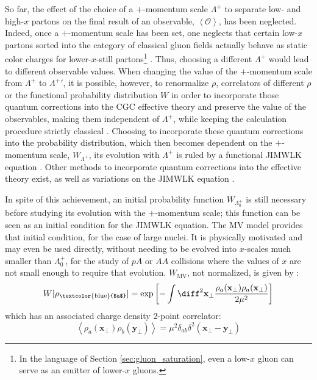 So far, the effect of the choice of a $+$-momentum scale $\Lambda^+$ to separate low- and high-$x$ partons on the final result of an observable, $\left< \mathcal{O} \right>$, has been neglected. Indeed, once a $+$-momentum scale has been set, one neglects that certain low-$x$ partons sorted into the category of classical gluon fields actually behave as static color charges for lower-$x$-still partons\footnote{In the language of Section \ref{sec:gluon_saturation}, even a low-$x$ gluon can serve as an emitter of lower-$x$ gluons.} \cite{Albacete_2014}. Thus, choosing a different $\Lambda^+$ would lead to different observable values. When changing the value of the $+$-momentum scale from $\Lambda^+$ to ${\Lambda^+}'$, it is possible, however, to renormalize $\rho$, correlators of different $\rho$ or the functional probability distribution  $W$ in order to incorporate those quantum corrections into the \gls{CGC} effective theory and preserve the value of the observables, making them independent of $\Lambda^+$, while keeping the calculation procedure strictly classical \cite{Albacete_2014}. Choosing to incorporate these quantum corrections into the probability distribution, which then becomes dependent on the $+$-momentum scale, $W_{\Lambda^+}$, its evolution with $\Lambda^+$ is ruled by a functional \gls{JIMWLK} equation \cite{Gelis_2010}. Other methods to incorporate quantum corrections into the effective theory exist, as well as variations on the \gls{JIMWLK} equation \cite{Albacete_2014}.

In spite of this achievement, an initial probability function $W_{\Lambda^+_0}$ is still necessary before studying its evolution with the $+$-momentum scale; this function can be seen as an initial condition for the \gls{JIMWLK} equation. The \gls{MV} model provides that initial condition, for the case of large nuclei. It is physically motivated and may even be used directly, without needing to be evolved into $x$-scales much smaller than $\Lambda_0^+$, for the study of $pA$ or $AA$ collisions where the values of $x$ are not small enough to require that evolution. \cite{Gelis_2010}  $W_{\text{MV}}$, not normalized, is given by \cite{Gelis_Habilitation}:
\begin{equation}
	W[\rho_\text{\textcolor{blue}{$a$}}] = \exp \left[ - \int \diff^2 \mathbf{x}_\perp \frac{\rho_a(\mathbf{x_\perp})\rho_a(\mathbf{x_\perp})}{2 \mu^2} \right]
\end{equation}
which has an associated charge density 2-point correlator:
\begin{equation}
	\left< \rho_a(\mathbf{x}_\perp) \rho_b (\mathbf{y}_\perp) \right> = \mu^2 \delta_{ab} \delta^2 (\mathbf{x}_\perp - \mathbf{y}_\perp)
\end{equation}

